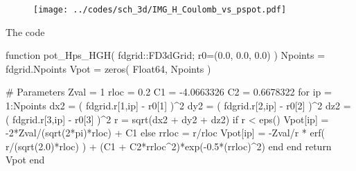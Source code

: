 \begin{figure}[H]
{\centering
\texttt{[image: ../codes/sch\_3d/IMG\_H\_Coulomb\_vs\_pspot.pdf]}
\par}
\end{figure}

The code
\begin{juliacode}
function pot_Hps_HGH( fdgrid::FD3dGrid; r0=(0.0, 0.0, 0.0) )
    Npoints = fdgrid.Npoints
    Vpot = zeros( Float64, Npoints )

    # Parameters
    Zval = 1
    rloc = 0.2
    C1 = -4.0663326
    C2 = 0.6678322
    for ip = 1:Npoints
        dx2 = ( fdgrid.r[1,ip] - r0[1] )^2
        dy2 = ( fdgrid.r[2,ip] - r0[2] )^2
        dz2 = ( fdgrid.r[3,ip] - r0[3] )^2
        r = sqrt(dx2 + dy2 + dz2)
        if r < eps()
            Vpot[ip] = -2*Zval/(sqrt(2*pi)*rloc) + C1
        else
            rrloc = r/rloc
            Vpot[ip] = -Zval/r * erf( r/(sqrt(2.0)*rloc) ) +
                     (C1 + C2*rrloc^2)*exp(-0.5*(rrloc)^2)
        end
    end
    return Vpot
end
\end{juliacode}
